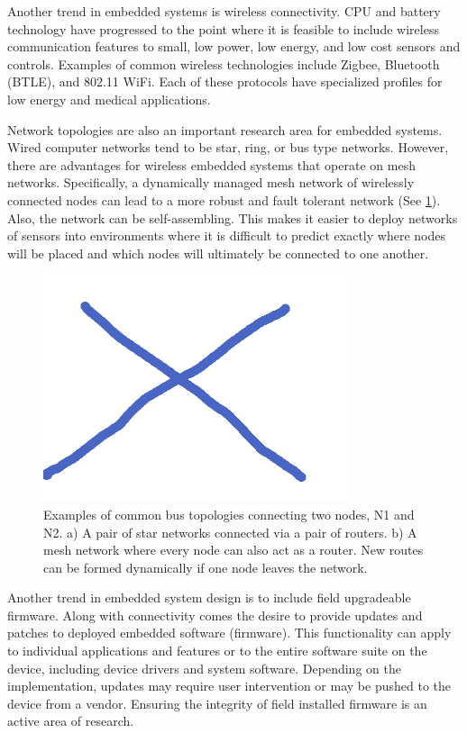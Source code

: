 \documentclass[final,conference,11pt]{IEEEtran}
\begin{document}
Another trend in embedded systems is wireless connectivity.  CPU and battery technology have progressed to the point where it is feasible to include wireless communication features to small, low power, low energy, and low cost sensors and controls.  Examples of common wireless technologies include Zigbee, Bluetooth (BTLE), and 802.11 WiFi.  Each of these protocols have specialized profiles for low energy and medical applications.

Network topologies are also an important research area for embedded systems.  Wired computer networks tend to be star, ring, or bus type networks.  However, there are advantages for wireless embedded systems that operate on mesh networks.  Specifically, a dynamically managed mesh network of wirelessly connected nodes can lead to a more robust and fault tolerant network (See \figurename \ref{fig:topology}).  Also, the network can be self-assembling.  This makes it easier to deploy networks of sensors into environments where it is difficult to predict exactly where nodes will be placed and which nodes will ultimately be connected to one another.\cite{Vasserman2013}

\begin{figure}[!t]
\centering
\includegraphics[width=3.5in]{topology}
\caption{Examples of common bus topologies connecting two nodes, N1 and N2.  a) A pair of star networks connected via a pair of routers. b) A mesh network where every node can also act as a router. New routes can be formed dynamically if one node leaves the network.}
\label{fig:topology}
\end{figure}

Another trend in embedded system design is to include field upgradeable firmware.  Along with connectivity comes the desire to provide updates and patches to deployed embedded software (firmware).  This functionality can apply to individual applications and features or to the entire software suite on the device, including device drivers and system software.  Depending on the implementation, updates may require user intervention or may be pushed to the device from a vendor.  Ensuring the integrity of field installed firmware is an active area of research.
\end{document}
